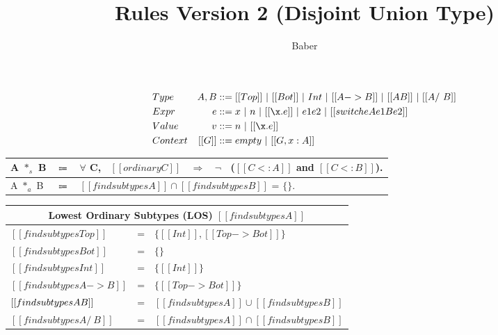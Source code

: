 \documentclass[a4paper]{article}
\title{Rules Version 2 (Disjoint Union Type)}
\author{Baber}
\begin{document}
\maketitle

\begin{align*}
&Type &A, B&::= [[Top]] ~ | ~[[Bot]]~|~ Int ~|~ [[A->B]]~ |~ [[A \/ B]] ~ |~ [[A /\ B]]\\
&Expr &e &::= x ~|~ n ~|~[[\x.e]] ~ | ~ e1e2 ~|~ [[switch e A e1 B e2]]\\
&Value &v &::= n ~|~ [[\x.e]] \\
&Context & [[G]] &::= empty~ |~ [[G , x : A]]
\end{align*}


     {\renewcommand{\arraystretch}{1.5}
     \begin{center}
     \begin{tabular}{|lcl|}
       \hline
  A $*_s$ B & $\Coloneqq$ & $\forall$ C, \ $[[ordinary C]]$ \ $\Longrightarrow$ \ $\neg$ \ ($[[C <: A]]$ and $[[C <: B]]$). \\
       \hline
    A $*_a$ B & $\Coloneqq$ & $ [[findsubtypes A]] \cap [[findsubtypes B]] $ = $\{\}$. \\
       \hline
     \end{tabular}
     \end{center} }

    \centering
    {\renewcommand{\arraystretch}{1.2}
    \begin{tabular}{|lcl|}
      \multicolumn{3}{c}{Lowest Ordinary Subtypes (LOS) $[[findsubtypes A]]$} \\
      \hline
     $[[findsubtypes Top]]$ & = & $\{ [[Int]], [[Top -> Bot]]\}$  \\
     $[[findsubtypes Bot]]$ & = & $\{\}$  \\
     $[[findsubtypes Int]]$ & = & $\{ [[Int]] \}$  \\
     $[[findsubtypes A -> B]]$ & = & $\{ [[Top -> Bot]] \}$  \\
     $[[findsubtypes A \/ B]]$ & = & $ [[findsubtypes A]] \cup [[findsubtypes B]] $\\
     $[[findsubtypes A /\ B]]$ & = & $ [[findsubtypes A]] \cap [[findsubtypes B]] $\\
      \hline
    \end{tabular} }
    
\end{document}
